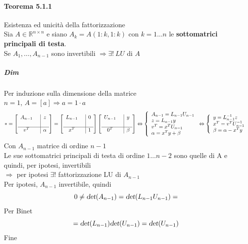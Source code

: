 \documentclass[10pt]{book}
\begin{document}
\paragraph{Teorema 5.1.1} Esistenza ed unicità della fattorizzazione\\
Sia $A \in \mathbb{R}^{n \times n}$ e siano $A_k = A(1:k, 1:k)$ con $k = 1\ldots n$ le \textbf{sottomatrici principali di testa}.\\
Se $A_1, \ldots, A_{n-1}$ sono invertibili $\Rightarrow\exists !\: LU$ di $A$
\subparagraph{Dim} Per induzione sulla dimensione della matrice\\
$n = 1$, $A = [a] \Rightarrow a = 1\cdot a$
$$* = \left[ 
\begin{array}{c c | c}
	A_{n-1} & & z\\
	& &\\
	\hline
	v^T & & \alpha
\end{array}
\right]
= \left[ 
\begin{array}{c c | c}
	L_{n-1} & & 0\\
	& &\\
	\hline
	x^T & & 1
\end{array}
\right]
\left[ 
\begin{array}{c c | c}
	U_{n-1} & & y\\
	& &\\
	\hline
	0^T & & \beta
\end{array}
\right]
\Leftrightarrow
\left\{
\begin{array}{l}
A_{n-1} = L_{n-1}U_{n-1}\\
z = L_{n-1}y\\
v^T = x^T U_{n-1}\\
\alpha = x^T y + \beta
\end{array}
\right.
\Leftrightarrow
\left\{
\begin{array}{l}
y = L_{n-1}^{-1}z\\
x^T = v^T U_{n-1}^{-1}\\
\beta = \alpha - x^Ty
\end{array}
\right.
$$
Con $A_{n-1}$ matrice di ordine $n - 1$\\
Le sue sottomatrici principali di testa di ordine $1\ldots n-2$ sono quelle di A e quindi, per ipotesi, invertibili\\
$\Rightarrow$ per ipotesi $\exists !$ fattorizzazione LU di $A_{n-1}$\\
Per ipotesi, $A_{n-1}$ invertibile, quindi
$$0 \neq \textsl{det}(A_{n-1}) = \textsl{det}(L_{n-1}U_{n-1}) =$$
Per Binet
$$ = \textsl{det}(L_{n-1})\textsl{det}(U_{n-1}) = \textsl{det}(U_{n-1})$$
Fine
\end{document}
